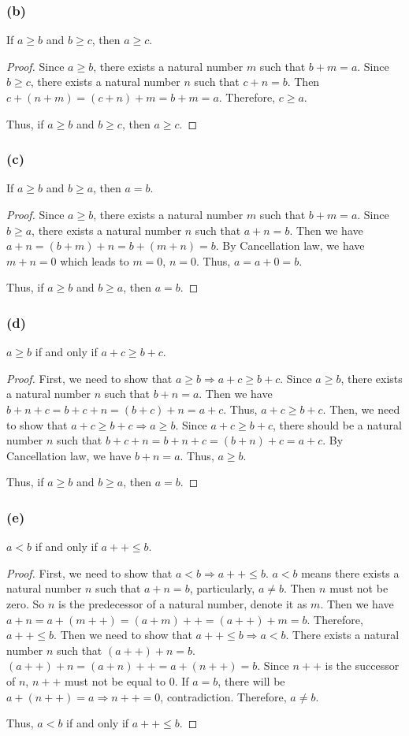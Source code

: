 \documentclass[12pt, letter]{article}
\begin{document}
\subsubsection*{(b)}
If $a\geq b$ and $b\geq c$, then $a\geq c$.
\begin{proof}
    Since $a\geq b$, there exists a natural number $m$ such that $b+m=a$. Since $b\geq c$, there exists a natural 
    number $n$ such that $c+n=b$. Then $c+(n+m)=(c+n)+m=b+m=a$. Therefore, $c\geq a$.

    Thus, if $a\geq b$ and $b\geq c$, then $a\geq c$.
\end{proof}
\subsubsection*{(c)}
If $a\geq b$ and $b\geq a$, then $a=b$.
\begin{proof}
    Since $a\geq b$, there exists a natural number $m$ such that $b+m=a$. Since $b\geq a$, there exists a natural number $n$ such that $a+n=b$. Then we have $a+n=(b+m)+n=b+(m+n)=b$. 
    By Cancellation law, we have $m+n=0$ which leads to $m=0$, $n=0$. Thus, $a=a+0=b$. 

    Thus, if $a\geq b$ and $b\geq a$, then $a=b$.
\end{proof}
\subsubsection*{(d)}
$a\geq b$ if and only if $a+c\geq b+c$.
\begin{proof}
    First, we need to show that $a\geq b \Rightarrow a+c\geq b+c$. Since $a\geq b$, there exists a natural number $n$ such that 
    $b+n=a$. Then we have $b+n+c=b+c+n=(b+c)+n=a+c$. Thus, $a+c\geq b+c$. Then, we need to show that $a+c\geq b+c\Rightarrow a\geq b$. Since $a+c\geq b+c$, there should be a natural number $n$ such 
    that $b+c+n=b+n+c=(b+n)+c=a+c$. By Cancellation law, we have $b+n=a$. Thus, $a\geq b$. 

    Thus, if $a\geq b$ and $b\geq a$, then $a=b$.
\end{proof}
\subsubsection*{(e)}
$a<b$ if and only if $a++\leq b$.
\begin{proof}
    First, we need to show that $a<b\Rightarrow a++\leq b$. $a<b$ means there exists a natural number $n$ such that 
    $a+n=b$, particularly, $a\ne b$. Then $n$ must not be zero. So $n$ is the predecessor of a natural number, denote it as $m$. Then we have $a+n=a+(m++)=(a+m)++=(a++)+m=b$. Therefore, $a++\leq b$. Then 
    we need to show that $a++\leq b\Rightarrow a<b$. There exists a natural number $n$ such that $(a++)+n=b$. $(a++)+n=(a+n)++=a+(n++)=b$. Since $n++$ is the successor of $n$, $n++$ must not be equal to $0$.
    If $a=b$, there will be $a+(n++)=a\Rightarrow n++=0$, contradiction. Therefore, $a\ne b$. 
    
    Thus, $a<b$ if and only if $a++\leq b$.
\end{proof}
\end{document}
